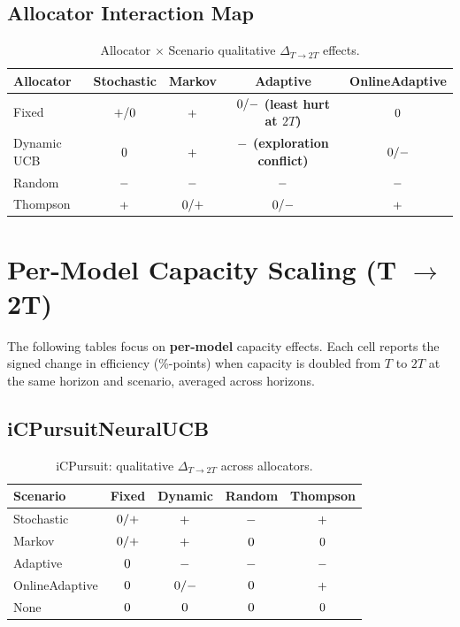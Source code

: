 \documentclass[11pt,a4paper]{article}
\newcommand{\critical}[1]{\textcolor{criticalcolor}{\textbf{#1}}}
\newcommand{\success}[1]{\textcolor{successcolor}{\textbf{#1}}}
\begin{document}
\subsection{Allocator Interaction Map}
\begin{table}[H]
\centering
\scriptsize
\begin{tabular}{lcccc}
\toprule
\textbf{Allocator} & \textbf{Stochastic} & \textbf{Markov} & \textbf{Adaptive} & \textbf{OnlineAdaptive} \\
\midrule
Fixed & ${\small +/0}$ & ${\small +}$ & \success{${\small 0/-}$ (least hurt at $2T$)} & ${\small 0}$ \\
Dynamic UCB & ${\small 0}$ & \success{${\small +}$} & \critical{${\small -}$ (exploration conflict)} & ${\small 0/-}$ \\
Random & \critical{${\small -}$} & \critical{${\small -}$} & \critical{${\small -}$} & \critical{${\small -}$} \\
Thompson & \success{${\small +}$} & ${\small 0/+}$ & ${\small 0/-}$ & \success{${\small +}$} \\
\bottomrule
\end{tabular}
\caption{Allocator $\times$ Scenario qualitative $\Delta_{T\rightarrow 2T}$ effects.}
\end{table}

\section{Per-Model Capacity Scaling (T $\rightarrow$ 2T)}

The following tables focus on \textbf{per-model} capacity effects. Each cell reports the signed change in efficiency (\%-points) when capacity is doubled from $T$ to $2T$ at the same horizon and scenario, averaged across horizons.

\subsection{iCPursuitNeuralUCB}
\begin{table}[H]
\centering
\scriptsize
\begin{tabular}{lcccc}
\toprule
\textbf{Scenario} & \textbf{Fixed} & \textbf{Dynamic} & \textbf{Random} & \textbf{Thompson} \\
\midrule
Stochastic & ${\small 0/+}$ & ${\small +}$ & ${\small -}$ & \success{${\small +}$} \\
Markov & ${\small 0/+}$ & \success{${\small +}$} & ${\small 0}$ & ${\small 0}$ \\
Adaptive & \success{${\small 0}$} & \critical{${\small -}$} & \critical{${\small -}$} & ${\small -}$ \\
OnlineAdaptive & ${\small 0}$ & ${\small 0/-}$ & ${\small 0}$ & \success{${\small +}$} \\
None & ${\small 0}$ & ${\small 0}$ & ${\small 0}$ & ${\small 0}$ \\
\bottomrule
\end{tabular}
\caption{iCPursuit: qualitative $\Delta_{T\rightarrow 2T}$ across allocators.}
\end{table}
\end{document}
